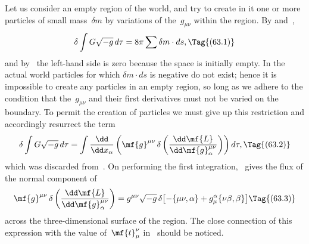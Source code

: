 \documentclass[12pt]{book}
\begin{document}
%
%

Let us consider an empty region of the world, and try to create in it one
or more particles of small mass~$\delta m$ by variations of the~$g_{\mu\nu}$ within the region.
By  and~,
\[
\delta \int G\sqrt{-g}\, d\tau = 8\pi \sum \delta m \cdot ds,
\Tag{(63.1)}
\]
and by~ the left-hand side is zero because the space is initially empty.
In the actual world particles for which $\delta m \cdot ds$ is negative do not exist; hence it
is impossible to create any particles in an empty region, so long as we adhere
to the condition that the~$g_{\mu\nu}$ and their first derivatives must not be varied on
the boundary. To permit the creation of particles we must give up this
restriction and accordingly resurrect the term
\[
\delta \int G\sqrt{-g}\, d\tau
= \int \frac{\dd}{\dd x_{\alpha}} \left(\mf{g}^{\mu\nu}\, \delta\left(\frac{\dd\mf{L}}{\dd\mf{g}_{\alpha}^{\mu\nu}}\right)\right) d\tau,
\Tag{(63.2)}
\]
which was discarded from~. On performing the first integration, ~gives
the flux of the normal component of
\[
\mf{g}^{\mu\nu}\, \delta\left(\frac{\dd\mf{L}}{\dd\mf{g}_{\alpha}^{\mu\nu}}\right)
= g^{\mu\nu} \sqrt{-g}\, \delta\bigl[-\{\mu\nu, \alpha\} + g_{\mu}^{\alpha} \{\nu\beta, \beta\}\bigr]
\Tag{(63.3)}
\]
across the three\hyp{}dimensional surface of the region. The close connection of
this expression with the value of~$\mf{t}_{\mu}^{\nu}$ in~ should be noticed.
\end{document}
